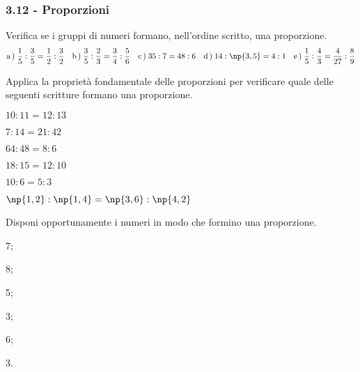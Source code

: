 \subsubsection*{3.12 - Proporzioni}

\begin{esercizio}
 \label{ese:3.115}
Verifica se i gruppi di numeri formano, nell'ordine scritto, una proporzione.
\[
\text{a}\,\text{)}\;\frac{1}{5}:\frac{3}{5}=\frac{1}{2}:\frac{3}{2}\quad
\text{b}\,\text{)}\;\frac{3}{5}:\frac{2}{3}=\frac{3}{4}:\frac{5}{6}\quad
\text{c}\,\text{)}\;35:7=48:6\quad
\text{d}\,\text{)}\;14:\np{3,5}=4:1\quad
\text{e}\,\text{)}\;\frac{1}{5}:\frac{4}{3}=\frac{4}{27}:\frac{8}{9}
\]
\end{esercizio}

\begin{esercizio}
 \label{ese:3.116}
 Applica la proprietà fondamentale delle proporzioni per verificare quale delle seguenti
scritture formano una proporzione.
\begin{multicols}{2}
 \TabPositions{4cm}
 \begin{enumeratea}
 \item $10:11=12:13$ \tab\quad\boxSi\quad\boxNo
 \item $7:14=21:42$ \tab\quad\boxSi\quad\boxNo
 \item $64:48=8:6$ \tab\quad\boxSi\quad\boxNo
 \item $18:15=12:10$ \tab\quad\boxSi\quad\boxNo
 \item $10:6=5:3$ \tab\quad\boxSi\quad\boxNo
 \item $\np{1,2}:\np{1,4}=\np{3,6}:\np{4,2}$ \tab\quad\boxSi\quad\boxNo
 \end{enumeratea}
 \end{multicols}
\end{esercizio}
\pagebreak
\begin{esercizio}
 \label{ese:3.117}
Disponi opportunamente i numeri in modo che formino una proporzione.
\begin{multicols}{2}
\begin{enumeratea}
\item 7;
\item 8;
\item 5;
\item 3;
\item 6;
\item 3.
\end{enumeratea}
 \end{multicols}
\end{esercizio}

